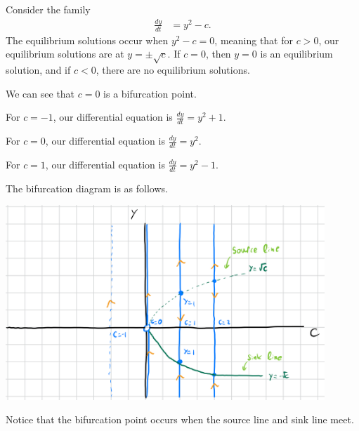\documentclass[10pt]{mypackage}
\begin{document}
\begin{example}
  Consider the family
  \begin{align*}
    \frac{dy}{dt} &= y^2 - c.
  \end{align*}
  The equilibrium solutions occur when $y^2 - c = 0$, meaning that for $c > 0$, our equilibrium solutions are at $y=\pm\sqrt{c}$. If $c = 0$, then $y=0$ is an equilibrium solution, and if $c < 0$, there are no equilibrium solutions.\newline

  We can see that $c = 0$ is a bifurcation point.\newline

  For $c = -1$, our differential equation is $\frac{dy}{dt} = y^2 + 1$.
  \begin{center}
  \end{center}
  For $c = 0$, our differential equation is $\frac{dy}{dt} = y^2$.
  \begin{center}
  \end{center}
  For $c = 1$, our differential equation is $\frac{dy}{dt} = y^2 - 1$.
  \begin{center}
  \end{center}
  The bifurcation diagram is as follows. 
  \begin{center}
    \includegraphics[width=12cm]{images/bifurcation_diagram.png}
  \end{center}
  Notice that the bifurcation point occurs when the source line and sink line meet.
\end{example}
\end{document}
